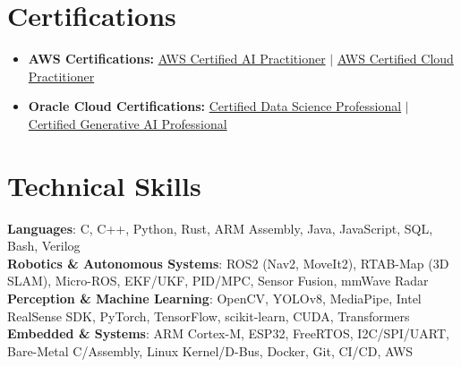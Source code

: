 \documentclass[letterpaper,10pt]{article}
\begin{document}
\section{Certifications}
  \begin{itemize}[leftmargin=0.12in, label={}, itemsep=0.5pt, parsep=0pt, topsep=0.5pt]
    \item \small{\textbf{AWS Certifications:} \href{https://cp.certmetrics.com/amazon/en/public/verify/credential/c4c58cf840b94cecade967170c4e6eb1}{AWS Certified AI Practitioner} $|$ \href{https://cp.certmetrics.com/amazon/en/public/verify/credential/bc3e81176da04bd6ab3dcff612193814}{AWS Certified Cloud Practitioner}}
    \item \small{\textbf{Oracle Cloud Certifications:} \href{https://catalog-education.oracle.com/pls/certview/sharebadge?id=C3199CDA4E4B76D94AEAE70CFCA292011795FEFB3BCD93A18A1454E57C60B0AA}{Certified Data Science Professional} $|$ \href{https://catalog-education.oracle.com/pls/certview/sharebadge?id=EF9A070356E9FB420B39ED42ACCD6CC9326E5653AE07F025C334A2F0238D4652}{Certified Generative AI Professional}}
  \end{itemize}

\section{Technical Skills}
 \begin{itemize}[leftmargin=0.12in, label={}, itemsep=0.5pt, parsep=0pt, topsep=0.5pt]
  \small{\item{
    \textbf{Languages}{: C, C++, Python, Rust, ARM Assembly, Java, JavaScript, SQL, Bash, Verilog} \\
    \textbf{Robotics \& Autonomous Systems}{: ROS2 (Nav2, MoveIt2), RTAB-Map (3D SLAM), Micro-ROS, EKF/UKF, PID/MPC, Sensor Fusion, mmWave Radar} \\
    \textbf{Perception \& Machine Learning}{: OpenCV, YOLOv8, MediaPipe, Intel RealSense SDK, PyTorch, TensorFlow, scikit-learn, CUDA, Transformers} \\
    \textbf{Embedded \& Systems}{: ARM Cortex-M, ESP32, FreeRTOS, I2C/SPI/UART, Bare-Metal C/Assembly, Linux Kernel/D-Bus, Docker, Git, CI/CD, AWS}
  }}
 \end{itemize}

\end{document}
